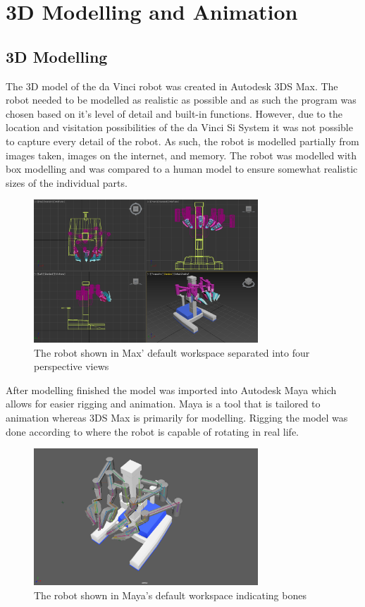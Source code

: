 \chapter*{3D Modelling and Animation}

\section*{3D Modelling}
The 3D model of the da Vinci robot was created in Autodesk 3DS Max. The robot needed to be modelled as realistic as possible and as such the program was chosen based on it's level of detail and built-in functions. However, due to the location and visitation possibilities of the da Vinci Si System it was not possible to capture every detail of the robot. As such, the robot is modelled partially from images taken, images on the internet, and memory. The robot was modelled with box modelling and was compared to a human model to ensure somewhat realistic sizes of the individual parts.

\begin{figure}[H]
	\centering
	\includegraphics[width=0.75\textwidth]{ModelAnim/Max}
	\caption{The robot shown in Max' default workspace separated into four perspective views}
\end{figure}

After modelling finished the model was imported into Autodesk Maya which allows for easier rigging and animation. Maya is a tool that is tailored to animation whereas 3DS Max is primarily for modelling. Rigging the model was done according to where the robot is capable of rotating in real life.

\begin{figure}[H]
	\centering
	\includegraphics[width=0.75\textwidth]{ModelAnim/RobotMaya}
	\caption{The robot shown in Maya's default workspace indicating bones}
\end{figure}

